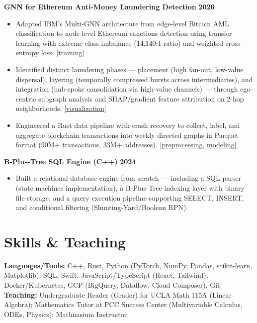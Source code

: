\documentclass[10pt, letterpaper]{article}
\begin{document}
\noindent \textbf{GNN for Ethereum Anti-Money Laundering Detection} \hfill \textbf{2026}
\begin{itemize}
    \item Adapted IBM's Multi-GNN architecture from edge-level Bitcoin AML classification to node-level Ethereum sanctions detection using transfer learning with extreme class imbalance (14,140:1 ratio) and weighted cross-entropy loss. [\href{https://github.com/Innovation-On-Blockchain/Transfer-Learning-Model-From-MultiGNN}{training}]
    \item Identified distinct laundering phases — placement (high fan-out, low-value dispersal), layering (temporally compressed bursts across intermediaries), and integration (hub-spoke consolidation via high-value channels) — through ego-centric subgraph analysis and SHAP/gradient feature attribution on 2-hop neighborhoods. [\href{https://github.com/Innovation-On-Blockchain/Data-Visualization}{visualization}]
    \item Engineered a Rust data pipeline with crash recovery to collect, label, and aggregate blockchain transactions into weekly directed graphs in Parquet format (90M+ transactions, 33M+ addresses). [\href{https://github.com/Innovation-On-Blockchain/Data-Preprocessing-For-AML}{preprocessing}, \href{https://github.com/Innovation-On-Blockchain/Data-Modeling}{modeling}]
\end{itemize}

\noindent \textbf{\href{https://github.com/Mike-Mans/C-SQL-CS008-Final-Project}{B-Plus-Tree SQL Engine} (C++)} \hfill \textbf{2024}
\begin{itemize}
    \item Built a relational database engine from scratch — including a SQL parser (state machines implementation), a B-Plus-Tree indexing layer with binary file storage, and a query execution pipeline supporting SELECT, INSERT, and conditional filtering (Shunting-Yard/Boolean RPN).
\end{itemize}

\section{Skills \& Teaching}
\textbf{Languages/Tools:} C++, Rust, Python (PyTorch, NumPy, Pandas, scikit-learn, Matplotlib), SQL, Swift, JavaScript/TypeScript (React, Tailwind), Docker/Kubernetes, GCP (BigQuery, Dataflow, Cloud Composer), Git \\
\textbf{Teaching:} Undergraduate Reader (Grader) for UCLA Math 115A (Linear Algebra); Mathematics Tutor at PCC Success Center (Multivariable Calculus, ODEs, Physics); Mathnasium Instructor.
\end{document}
